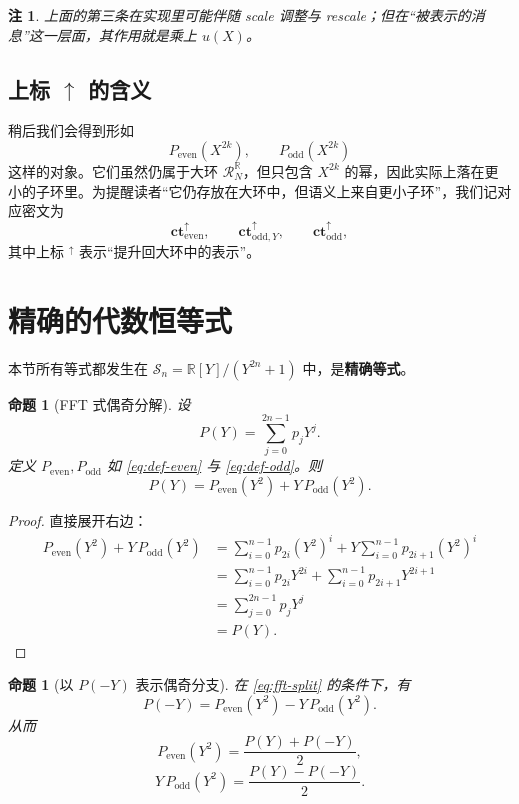 \documentclass[11pt,a4paper]{ctexart}
\newcommand{\RR}{\mathbb{R}}
\newcommand{\cte}{\mathbf{ct}_{\mathrm{even}}^{\uparrow}}
\newcommand{\ctoy}{\mathbf{ct}_{\mathrm{odd},Y}^{\uparrow}}
\newcommand{\cto}{\mathbf{ct}_{\mathrm{odd}}^{\uparrow}}
\newcommand{\Rbig}{\mathcal{R}_N^{\RR}}
\newcommand{\Ssmall}{\mathcal{S}_n}
\newtheorem{proposition}[definition]{命题}
\newtheorem{remark}[definition]{注}
\begin{document}
\begin{remark}
上面的第三条在实现里可能伴随 scale 调整与 rescale；但在“被表示的消息”这一层面，其作用就是乘上 \(u(X)\)。
\end{remark}

\subsection{上标 \(\uparrow\) 的含义}

稍后我们会得到形如
\[
P_{\mathrm{even}}(X^{2k}), \qquad P_{\mathrm{odd}}(X^{2k})
\]
这样的对象。它们虽然仍属于大环 \(\Rbig\)，但只包含 \(X^{2k}\) 的幂，因此实际上落在更小的子环里。为提醒读者“它仍存放在大环中，但语义上来自更小子环”，我们记对应密文为
\[
\cte,\qquad \ctoy,\qquad \cto,
\]
其中上标 \({}^{\uparrow}\) 表示“提升回大环中的表示”。

\section{精确的代数恒等式}

本节所有等式都发生在 \(\Ssmall=\RR[Y]/(Y^{2n}+1)\) 中，是\textbf{精确等式}。

\begin{proposition}[FFT 式偶奇分解]
设
\[
P(Y)=\sum_{j=0}^{2n-1}p_jY^j.
\]
定义 \(P_{\mathrm{even}}, P_{\mathrm{odd}}\) 如 \eqref{eq:def-even} 与 \eqref{eq:def-odd}。则
\begin{equation}
P(Y)=P_{\mathrm{even}}(Y^2)+Y\,P_{\mathrm{odd}}(Y^2). \label{eq:fft-split}
\end{equation}
\end{proposition}

\begin{proof}
直接展开右边：
\begin{align*}
P_{\mathrm{even}}(Y^2)+Y\,P_{\mathrm{odd}}(Y^2)
&=
\sum_{i=0}^{n-1}p_{2i}(Y^2)^i
+
Y\sum_{i=0}^{n-1}p_{2i+1}(Y^2)^i\\
&=
\sum_{i=0}^{n-1}p_{2i}Y^{2i}
+
\sum_{i=0}^{n-1}p_{2i+1}Y^{2i+1}\\
&=
\sum_{j=0}^{2n-1}p_jY^j\\
&=P(Y).
\end{align*}
\end{proof}

\begin{proposition}[以 \(P(-Y)\) 表示偶奇分支]
在 \eqref{eq:fft-split} 的条件下，有
\begin{equation}
P(-Y)=P_{\mathrm{even}}(Y^2)-Y\,P_{\mathrm{odd}}(Y^2). \label{eq:p-minus-y}
\end{equation}
从而
\begin{equation}
P_{\mathrm{even}}(Y^2)=\frac{P(Y)+P(-Y)}{2}, \label{eq:even-half-sum}
\end{equation}
\begin{equation}
Y\,P_{\mathrm{odd}}(Y^2)=\frac{P(Y)-P(-Y)}{2}. \label{eq:odd-half-diff}
\end{equation}
\end{proposition}
\end{document}

